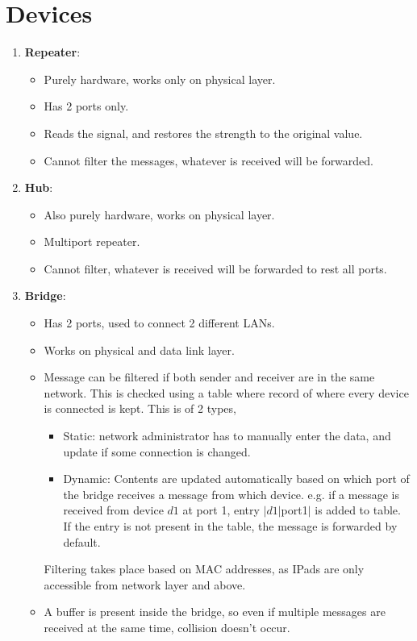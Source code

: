 \documentclass{article}
\begin{document}
\section{Devices}
\begin{enumerate}
	\item \textbf{Repeater}:
	\begin{itemize}
		\item Purely hardware, works only on physical layer.
		\item Has 2 ports only.
		\item Reads the signal, and restores the strength to the original value.
		\item Cannot filter the messages, whatever is received will be forwarded.
	\end{itemize}
	\item \textbf{Hub}:\begin{itemize}
		\item Also purely hardware, works on physical layer.
		\item Multiport repeater.
		\item Cannot filter, whatever is received will be forwarded to rest all ports.
	\end{itemize}
	\item \textbf{Bridge}:\begin{itemize}
		\item Has 2 ports, used to connect 2 different LANs.
		\item Works on physical and data link layer.
		\item Message can be filtered if both sender and receiver are in the same network. This is checked using a table where record of where every device is connected is kept. This is of 2 types, \begin{itemize}
			\item Static: network administrator has to manually enter the data, and update if some connection is changed.
			\item Dynamic: Contents are updated automatically based on which port of the bridge receives a message from which device. e.g. if a message is received from device $d1$ at port 1, entry $|d1|$port1$|$ is added to table.\\If the entry is not present in the table, the message is forwarded by default.
		\end{itemize}
		Filtering takes place based on MAC addresses, as IPads are only accessible from network layer and above.
		\item A buffer is present inside the bridge, so even if multiple messages are received at the same time, collision doesn't occur.

\end{itemize}
\end{enumerate}
\end{document}
